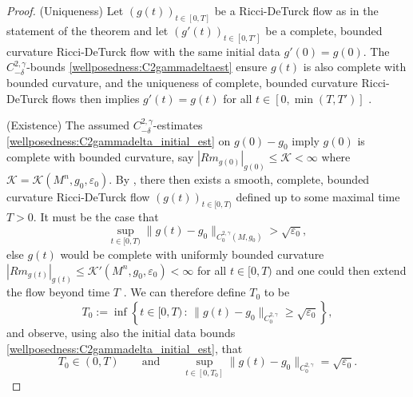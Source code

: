 \documentclass[12pt]{amsart}
\newcommand{\LB}{\left[}
\newcommand{\RB}{\right]}
\renewcommand{\1}{{\mathbf 1}}
\newcommand{\eps}{{\varepsilon}}
\theoremstyle{others}
\numberwithin{equation}{section}
\begin{document}
\begin{proof}
(Uniqueness)
    Let $(g(t))_{t \in [0, T]}$ be a Ricci-DeTurck flow as in the statement of the theorem and let $(g'(t))_{t \in [0, T']}$ be a complete, bounded curvature Ricci-DeTurck flow with the same initial data $g'(0 ) = g(0)$.
    The $C^{2, \gamma}_{-\delta}$-bounds \eqref{wellposedness:C2gammadeltaest} ensure $g(t)$ is also complete with bounded curvature, and
    the uniqueness of complete, bounded curvature Ricci-DeTurck flows then implies $g'(t) = g(t)$ for all $t \in [0, \min (T, T') ]$ \cite{ChenZhu06}.

(Existence)
    The assumed $C^{2, \gamma}_{-\delta}$-estimates \eqref{wellposedness:C2gammadelta_initial_est} on $g(0) - g_0$  imply $g(0)$ is complete with bounded curvature, say $|Rm_{g(0)}|_{g(0)} \le \mathcal K < \infty$ where $\mathcal K = \mathcal K(M^n, g_0, \eps_0)$.
    By \cite[Theorems 4.3 and 6.6]{Shi89},
    there then exists a smooth, complete, bounded curvature Ricci-DeTurck flow $(g(t))_{t \in [0, T)}$ defined up to some maximal time $T > 0$.
    It must be the case that 
        $$\sup_{t \in [0, T)} \| g(t) - g_0 \|_{C^{2, \gamma}_0(M, g_0)} > \sqrt{\eps_0},$$
    else $g(t)$ would be complete with uniformly bounded curvature $|Rm_{g(t)}|_{g(t)} \le \mathcal K'(M^n, g_0,\eps_0) < \infty$ for all $t \in [0, T)$ and one could then extend the flow beyond time $T$ \cite{Shi89}.
    We can therefore define $T_0$ to be
        $$T_0 := \inf \left\{ t \in [0, T) \, \colon \, \| g(t) - g_0 \|_{C^{2, \gamma}_0} \ge \sqrt{\eps_0} \right\},$$
    and observe, using also the initial data bounds \eqref{wellposedness:C2gammadelta_initial_est}, that
    \begin{equation} \label{well-posedness proof, eqn properties of T_0}
        T_0 \in (0, T) \qquad \text{and} \qquad \sup_{t \in [0, T_0] } \| g(t) - g_0 \|_{C^{2, \gamma}_0} = \sqrt{\eps_0}.
    \end{equation}
        


\end{proof}
\end{document}
